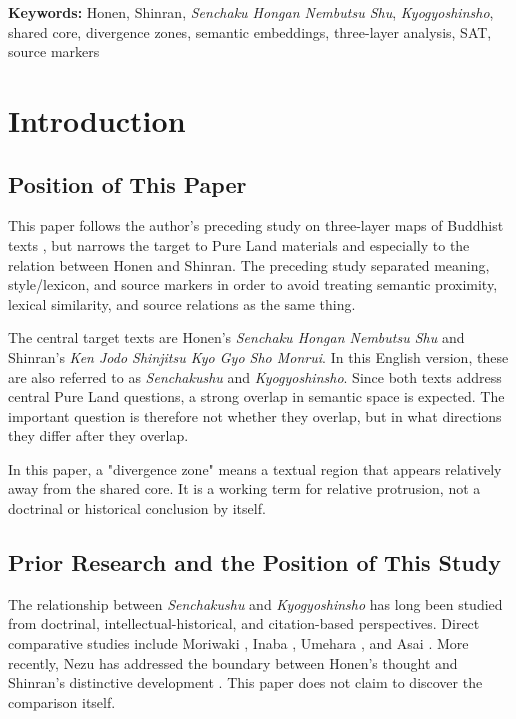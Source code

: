 \documentclass[uplatex,dvipdfmx,11pt,a4paper]{jsarticle}
\begin{document}
\noindent \textbf{Keywords:} Honen, Shinran, \emph{Senchaku Hongan Nembutsu Shu}, \emph{Kyogyoshinsho}, shared core, divergence zones, semantic embeddings, three-layer analysis, SAT, source markers

\section{Introduction}

\subsection{Position of This Paper}

This paper follows the author's preceding study on three-layer maps of Buddhist texts \cite{ueyama2026three-layer-map}, but narrows the target to Pure Land materials and especially to the relation between Honen and Shinran. The preceding study separated meaning, style/lexicon, and source markers in order to avoid treating semantic proximity, lexical similarity, and source relations as the same thing.

The central target texts are Honen's \emph{Senchaku Hongan Nembutsu Shu} and Shinran's \emph{Ken Jodo Shinjitsu Kyo Gyo Sho Monrui}. In this English version, these are also referred to as \emph{Senchakushu} and \emph{Kyogyoshinsho}. Since both texts address central Pure Land questions, a strong overlap in semantic space is expected. The important question is therefore not whether they overlap, but in what directions they differ after they overlap.

In this paper, a "divergence zone" means a textual region that appears relatively away from the shared core. It is a working term for relative protrusion, not a doctrinal or historical conclusion by itself.

\subsection{Prior Research and the Position of This Study}

The relationship between \emph{Senchakushu} and \emph{Kyogyoshinsho} has long been studied from doctrinal, intellectual-historical, and citation-based perspectives. Direct comparative studies include Moriwaki \cite{moriwaki1953}, Inaba \cite{inaba1972}, Umehara \cite{umehara1974}, and Asai \cite{asai2004}. More recently, Nezu has addressed the boundary between Honen's thought and Shinran's distinctive development \cite{nezu2024}. This paper does not claim to discover the comparison itself.
\end{document}

